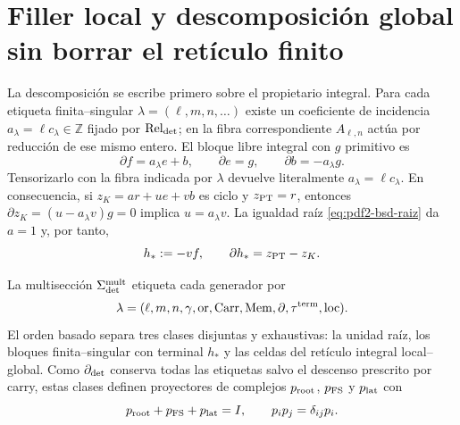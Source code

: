 \section{Filler local y descomposición global sin borrar el retículo finito}

La descomposición se escribe primero sobre el propietario integral. Para
cada etiqueta finita--singular $\lambda=(\ell,m,n,\ldots)$ existe un
coeficiente de incidencia $a_\lambda=\ell c_\lambda\in\mathbb Z$ fijado por
$\operatorname{Rel}_{\rm det}$; en la fibra correspondiente
$A_{\ell,n}$ actúa por reducción de ese mismo entero. El bloque libre
integral con $g$ primitivo es
\begin{equation}\label{eq:pdf2-bsd-bloque-normal}
 \partial f=a_\lambda e+b,\qquad
 \partial e=g,\qquad
 \partial b=-a_\lambda g.
\end{equation}
Tensorizarlo con la fibra indicada por $\lambda$ devuelve literalmente
$a_\lambda=\ell c_\lambda$. En consecuencia, si
$z_K=ar+ue+vb$ es ciclo y $z_{\rm PT}=r$, entonces
$\partial z_K=(u-a_\lambda v)g=0$ implica $u=a_\lambda v$. La igualdad raíz
\eqref{eq:pdf2-bsd-raiz} da $a=1$ y, por tanto,
\begin{equation}\label{eq:pdf2-bsd-filler-local}
 h_*:=-vf,\qquad \partial h_*=z_{\rm PT}-z_K.
\end{equation}

La multisección $\Sigma_{\rm det}^{\rm mult}$ etiqueta cada generador por
\begin{equation}\label{eq:pdf2-bsd-etiqueta-completa}
 \lambda=(\ell,m,n,\gamma,\operatorname{or},\operatorname{Carr},
 \operatorname{Mem},\partial,\tau^{\rm term},\operatorname{loc}).
\end{equation}
El orden basado separa tres clases disjuntas y exhaustivas: la unidad raíz,
los bloques finita--singular con terminal $h_*$ y las celdas del retículo
integral local--global. Como $\partial_{\rm det}$ conserva todas las
etiquetas salvo el descenso prescrito por carry, estas clases definen
proyectores de complejos $p_{\rm root}$, $p_{\rm FS}$ y $p_{\rm lat}$ con
\begin{equation}\label{eq:pdf2-bsd-tres-proyectores}
 p_{\rm root}+p_{\rm FS}+p_{\rm lat}=I,
 \qquad p_ip_j=\delta_{ij}p_i.
\end{equation}

